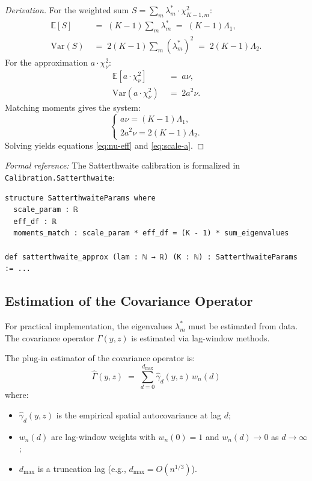\begin{proof}[Derivation]
For the weighted sum $S = \sum_{m} \lambda_m^* \cdot \chi^2_{K-1,m}$:
\begin{align}
\mathbb{E}[S] \;&=\; (K-1) \sum_{m} \lambda_m^* \;=\; (K-1)\Lambda_1, \\
\text{Var}(S) \;&=\; 2(K-1) \sum_{m} (\lambda_m^*)^2 \;=\; 2(K-1)\Lambda_2.
\end{align}
For the approximation $a \cdot \chi^2_{\nu}$:
\begin{align}
\mathbb{E}[a \cdot \chi^2_{\nu}] \;&=\; a\nu, \\
\text{Var}(a \cdot \chi^2_{\nu}) \;&=\; 2a^2\nu.
\end{align}
Matching moments gives the system:
\[
\begin{cases}
a\nu = (K-1)\Lambda_1,\\
2a^2\nu = 2(K-1)\Lambda_2.
\end{cases}
\]
Solving yields equations \eqref{eq:nu-eff} and \eqref{eq:scale-a}.
\end{proof}

\textit{Formal reference:} The Satterthwaite calibration is formalized in \texttt{Calibration.Satterthwaite}:
\begin{verbatim}
structure SatterthwaiteParams where
  scale_param : ℝ
  eff_df : ℝ
  moments_match : scale_param * eff_df = (K - 1) * sum_eigenvalues

def satterthwaite_approx (lam : ℕ → ℝ) (K : ℕ) : SatterthwaiteParams := ...
\end{verbatim}


\subsection{Estimation of the Covariance Operator}

For practical implementation, the eigenvalues $\lambda_m^*$ must be estimated from data. The covariance operator $\Gamma(y,z)$ is estimated via lag-window methods.

\begin{definition}\label{def:cov-estimator}
The plug-in estimator of the covariance operator is:
\begin{equation}
\widehat{\Gamma}(y,z) \;=\; \sum_{d=0}^{d_{\max}} \widehat{\gamma}_d(y,z) \, w_n(d)
\end{equation}
where:
\begin{itemize}
\item $\widehat{\gamma}_d(y,z)$ is the empirical spatial autocovariance at lag $d$;
\item $w_n(d)$ are lag-window weights with $w_n(0) = 1$ and $w_n(d) \to 0$ as $d \to \infty$;
\item $d_{\max}$ is a truncation lag (e.g., $d_{\max} = O(n^{1/3})$).
\end{itemize}
\end{definition}


